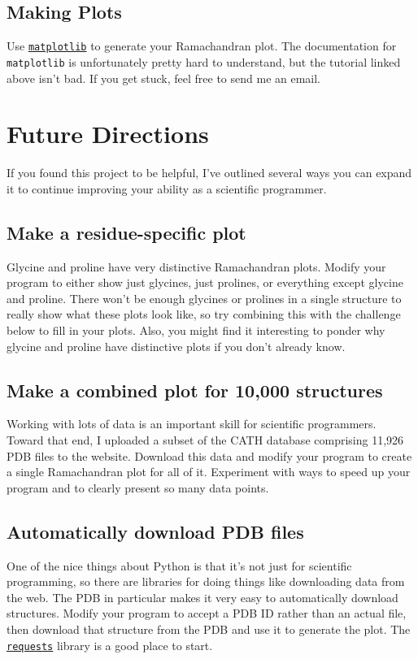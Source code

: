 \documentclass{article}
\newcommand{\module}[2]{\href{#2}{\texttt{#1}}}
\begin{document}
\subsection{Making Plots}

Use \module{matplotlib}{http://matplotlib.org/users/pyplot_tutorial.html} to 
generate your Ramachandran plot.  The documentation for \texttt{matplotlib} is 
unfortunately pretty hard to understand, but the tutorial linked above isn't 
bad.  If you get stuck, feel free to send me an email.

\section{Future Directions}

If you found this project to be helpful, I've outlined several ways you can 
expand it to continue improving your ability as a scientific programmer.

\subsection{Make a residue-specific plot}

Glycine and proline have very distinctive Ramachandran plots.  Modify your 
program to either show just glycines, just prolines, or everything except 
glycine and proline.  There won't be enough glycines or prolines in a single 
structure to really show what these plots look like, so try combining this with 
the challenge below to fill in your plots.  Also, you might find it interesting 
to ponder why glycine and proline have distinctive plots if you don't already 
know.

\subsection{Make a combined plot for 10,000 structures}

Working with lots of data is an important skill for scientific programmers.  
Toward that end, I uploaded a subset of the CATH database comprising 11,926 PDB 
files to the website.  Download this data and modify your program to create a 
single Ramachandran plot for all of it.  Experiment with ways to speed up your 
program and to clearly present so many data points.

\subsection{Automatically download PDB files}

One of the nice things about Python is that it's not just for scientific 
programming, so there are libraries for doing things like downloading data from 
the web.  The PDB in particular makes it very easy to automatically download 
structures.  Modify your program to accept a PDB ID rather than an actual file, 
then download that structure from the PDB and use it to generate the plot.
The \module{requests}{http://docs.python-requests.org} library is a good place 
to start.
\end{document}
